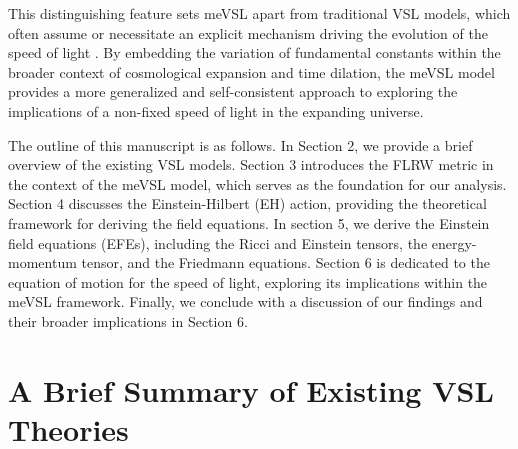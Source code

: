 \documentclass[jkps,preprint,fleqn]{revtex4} %
\begin{document}
This distinguishing feature sets meVSL apart from traditional VSL models, which often assume or necessitate an explicit mechanism driving the evolution of the speed of light \cite{Avelino:1999is,Belinchon:1999kq,Avelino:2000ph,Szydlowski:2002kz,Magueijo:2003gj,Shojaie:2004sq,Shojaie:2004xw,Balcerzak:2013kha,Balcerzak:2014rga,Franzmann:2017nsc,Hanimeli:2019wrt,Skara:2019usd,Bhattacharjee:2020fgl,Gupta:2020anq,Cuzinatto:2022mfe,Cuzinatto:2022vvy,Cuzinatto:2022dta,Bileska:2024odt,Coleman:1997xq,Albrecht:1998ir,Barrow:1998df,Barrow:1999is,Bassett:2000wj,Jacobson:2000xp,Magueijo:2000zt,Clayton:1998hv,Drummond:1999ut,Clayton:1999zs,Liberati:2000us,Clayton:2000xt,Drummond:2001rj,Amelino-Camelia:1996bln,Amelino-Camelia:1997ieq,Ellis:1999sd,Amelino-Camelia:2000bxx,Amelino-Camelia:2000cpa,Ellis:2000sf,Kowalski-Glikman:2001vvk,Bruno:2001mw,Magueijo:2001cr,Amelino-Camelia:2002uql,Magueijo:2002pg,Moffat:1992ud,Manida:1999rx,Barrow:1999st,Stepanov:1999ax,Magueijo:2000au,Moffat:2002nm,Kaelbermann:1998hu,Randall:1999ee,Randall:1999vf,Kiritsis:1999tx,Chung:1999xg,Alexander:1999cb,Ishihara:2000nf,Csaki:2000dm,Youm:2001sw,Youm:2001zk,Grojean:2001pv,Youm:2001zp,Drummond:1979pp,Novello:1988ma,Barton:1989dq,Scharnhorst:1990sr,Shore:1995fz,Colladay:1995qb,Coleman:1998ti,Bertolami:1999da,Shore:2000bs,Greenberg:2002uu,Teyssandier:2003qh,Shore:2003zc,Blasone:2003wf,Alexander:2001dr,Burgess:2002tb}.  By embedding the variation of fundamental constants within the broader context of cosmological expansion and time dilation, the meVSL model provides a more generalized and self-consistent approach to exploring the implications of a non-fixed speed of light in the expanding universe.

 The outline of this manuscript is as follows. In Section 2, we provide a brief overview of the existing VSL models.
Section 3 introduces the FLRW metric in the context of the meVSL model, which serves as the foundation for our analysis. Section 4 discusses the Einstein-Hilbert (EH) action, providing the theoretical framework for deriving the field equations. In section 5, we derive the Einstein field equations (EFEs), including the Ricci and Einstein tensors, the energy-momentum tensor, and the Friedmann equations. Section 6 is dedicated to the equation of motion for the speed of light, exploring its implications within the meVSL framework. Finally, we conclude with a discussion of our findings and their broader implications in Section 6.

\section{A Brief Summary of Existing VSL Theories}
\end{document}
